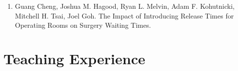\documentclass[12pt, a4paper]{article}
\begin{document}
{\begin{enumerate}[leftmargin=30pt, resume]
	\begin{itemize}
		\item {\footnotesize Finalist, 2025 POMS PITM Best Student Paper Competition}
		\item {\footnotesize Select for presentation at Workshop on Empirical Operations Management 2025}
	\end{itemize}

	\item Guang Cheng, Joshua M. Hagood, Ryan L. Melvin, Adam F. Kohutnicki, Mitchell H. Tsai, Joel Goh. The Impact of Introducing Release Times for Operating Rooms on Surgery Waiting Times.

\end{enumerate}






	
	
	




\section*{Teaching Experience}
\begin{itemize}


\end{itemize}}
\end{document}
